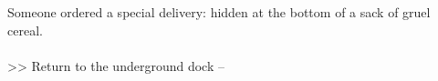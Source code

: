 Someone ordered a special delivery: hidden at the bottom of a sack of gruel cereal.\\
\\

>> Return to the underground dock -- 